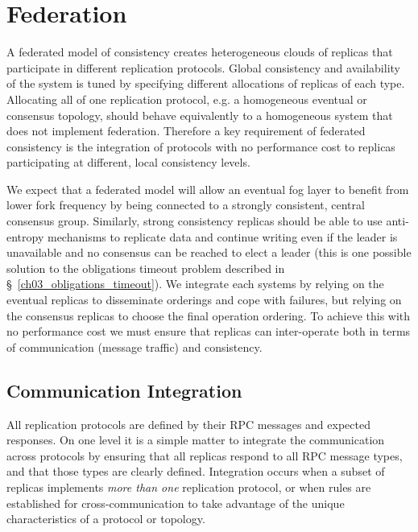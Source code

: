 \section{Federation}
\label{ch04_federation}

A federated model of consistency creates heterogeneous clouds of replicas that participate in different replication protocols.
Global consistency and availability of the system is tuned by specifying different allocations of replicas of each type.
Allocating all of one replication protocol, e.g. a homogeneous eventual or consensus topology, should behave equivalently to a homogeneous system that does not implement federation.
Therefore a key requirement of federated consistency is the integration of protocols with no performance cost to replicas participating at different, local consistency levels.

We expect that a federated model will allow an eventual fog layer to benefit from lower fork frequency by being connected to a strongly consistent, central consensus group.
Similarly, strong consistency replicas should be able to use anti-entropy mechanisms to replicate data and continue writing even if the leader is unavailable and no consensus can be reached to elect a leader (this is one possible solution to the obligations timeout problem described in \S~\ref{ch03_obligations_timeout}).
We integrate each systems by relying on the eventual replicas to disseminate orderings and cope with failures, but relying on the consensus replicas to choose the final operation ordering.
To achieve this with no performance cost we must ensure that replicas can inter-operate both in terms of communication (message traffic) and consistency.

\subsection{Communication Integration}
\label{ch04_communication_integration}

All replication protocols are defined by their RPC messages and expected responses.
On one level it is a simple matter to integrate the communication across protocols by ensuring that all replicas respond to all RPC message types, and that those types are clearly defined.
Integration occurs when a subset of replicas implements \textit{more than one} replication protocol, or when rules are established for cross-communication to take advantage of the unique characteristics of a protocol or topology.


